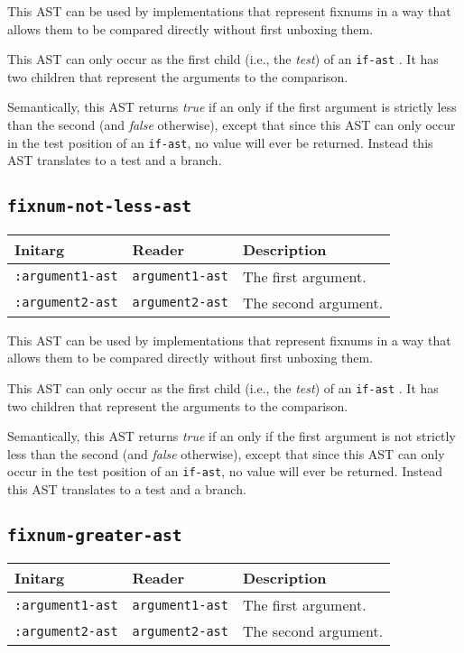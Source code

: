 This AST can be used by implementations that represent fixnums in a
way that allows them to be compared directly without first unboxing
them.

This AST can only occur as the first child (i.e., the \emph{test}) of
an \texttt{if-ast} .  It has two children that
represent the arguments to the comparison.  

Semantically, this AST returns \emph{true} if an only if the first
argument is strictly less than the second (and \emph{false}
otherwise), except that since this AST can only occur in the test
position of an \texttt{if-ast}, no value will ever be returned.
Instead this AST translates to a test and a branch. 

\subsection{\texttt{fixnum-not-less-ast}}
\label{fixnum-not-less-ast}

\begin{tabular}{|l|l|l|}
\hline
Initarg & Reader & Description\\
\hline\hline
\texttt{:argument1-ast} & \texttt{argument1-ast} & The first argument.\\
\hline
\texttt{:argument2-ast} & \texttt{argument2-ast} & The second argument.\\
\hline
\end{tabular}

This AST can be used by implementations that represent fixnums in a
way that allows them to be compared directly without first unboxing
them.

This AST can only occur as the first child (i.e., the \emph{test}) of
an \texttt{if-ast} .  It has two children that
represent the arguments to the comparison.  

Semantically, this AST returns \emph{true} if an only if the first
argument is not strictly less than the second (and \emph{false}
otherwise), except that since this AST can only occur in the test
position of an \texttt{if-ast}, no value will ever be returned.
Instead this AST translates to a test and a branch. 

\subsection{\texttt{fixnum-greater-ast}}
\label{fixnum-greater-ast}

\begin{tabular}{|l|l|l|}
\hline
Initarg & Reader & Description\\
\hline\hline
\texttt{:argument1-ast} & \texttt{argument1-ast} & The first argument.\\
\hline
\texttt{:argument2-ast} & \texttt{argument2-ast} & The second argument.\\
\hline
\end{tabular}

